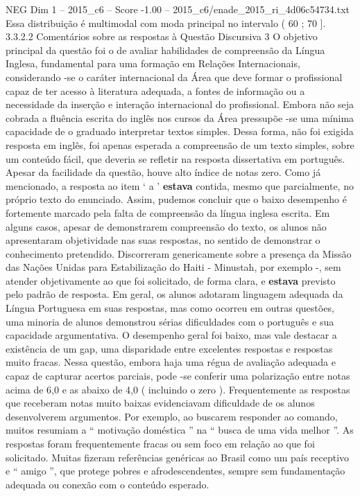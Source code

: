\begin{textsample}{NEG Dim 1 – 2015\_c6 – Score -1.00 – 2015\_c6/enade\_2015\_ri\_4d06c54734.txt}
Essa distribuição é multimodal com moda principal no intervalo ( 60 ; 70 ]. 3.3.2.2 Comentários sobre as respostas à Questão Discursiva 3 O objetivo principal da questão foi o de avaliar habilidades de compreensão da Língua Inglesa, fundamental para uma formação em Relações Internacionais, considerando -se o caráter internacional da Área que deve formar o profissional capaz de ter acesso à literatura adequada, a fontes de informação ou a necessidade da inserção e interação internacional do profissional.
Embora não seja cobrada a fluência escrita do inglês nos cursos da Área pressupõe -se uma mínima capacidade de o graduado interpretar textos simples.
Dessa forma, não foi exigida resposta em inglês, foi apenas esperada a compreensão de um texto simples, sobre um conteúdo fácil, que deveria se refletir na resposta dissertativa em português.
Apesar da facilidade da questão, houve alto índice de notas zero.
Como já mencionado, a resposta ao item ‘ a ’ \textbf{estava} contida, mesmo que parcialmente, no próprio texto do enunciado.
Assim, pudemos concluir que o baixo desempenho é fortemente marcado pela falta de compreensão da língua inglesa escrita.
Em alguns casos, apesar de demonstrarem compreensão do texto, os alunos não apresentaram objetividade nas suas respostas, no sentido de demonstrar o conhecimento pretendido.
Discorreram genericamente sobre a presença da Missão das Nações Unidas para Estabilização do Haiti - Minustah, por exemplo -, sem atender objetivamente ao que foi solicitado, de forma clara, e \textbf{estava} previsto pelo padrão de resposta.
Em geral, os alunos adotaram linguagem adequada da Língua Portuguesa em suas respostas, mas como ocorreu em outras questões, uma minoria de alunos demonstrou sérias dificuldades com o português e sua capacidade argumentativa.
O desempenho geral foi baixo, mas vale destacar a existência de um gap, uma disparidade entre excelentes respostas e respostas muito fracas.
Nessa questão, embora haja uma régua de avaliação adequada e capaz de capturar acertos parciais, pode -se conferir uma polarização entre notas acima de 6,0 e as abaixo de 4,0 ( incluindo o zero ).
Frequentemente as respostas que receberam notas muito baixas evidenciavam dificuldade de os alunos desenvolverem argumentos.
Por exemplo, ao buscarem responder ao comando, muitos resumiam a “ motivação doméstica ” na “ busca de uma vida melhor ”.
As respostas foram frequentemente fracas ou sem foco em relação ao que foi solicitado.
Muitas fizeram referências genéricas ao Brasil como um país receptivo e “ amigo ”, que protege pobres e afrodescendentes, sempre sem fundamentação adequada ou conexão com o conteúdo esperado.

\end{textsample}
